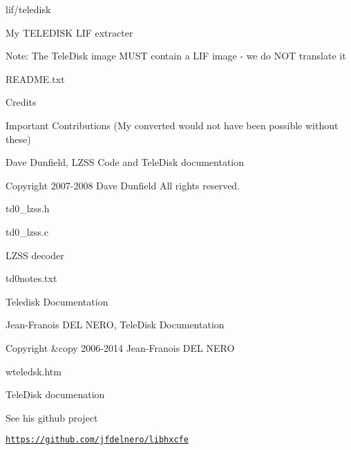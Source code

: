 lif/teledisk
\begin{DoxyItemize}
\item My T\+E\+L\+E\+D\+I\+SK L\+IF extracter
\begin{DoxyItemize}
\item Note\+: The Tele\+Disk image M\+U\+ST contain a L\+IF image -\/ we do N\+OT translate it
\end{DoxyItemize}
\item R\+E\+A\+D\+M\+E.\+txt
\begin{DoxyItemize}
\item Credits
\end{DoxyItemize}
\item Important Contributions (My converted would not have been possible without these)
\begin{DoxyItemize}
\item Dave Dunfield, L\+Z\+SS Code and Tele\+Disk documentation
\begin{DoxyItemize}
\item Copyright 2007-\/2008 Dave Dunfield All rights reserved.
\item td0\+\_\+lzss.\+h
\item td0\+\_\+lzss.\+c
\begin{DoxyItemize}
\item L\+Z\+SS decoder
\end{DoxyItemize}
\item td0notes.\+txt
\begin{DoxyItemize}
\item Teledisk Documentation
\end{DoxyItemize}
\end{DoxyItemize}
\item Jean-\/\+Franois D\+EL N\+E\+RO, Tele\+Disk Documentation
\begin{DoxyItemize}
\item Copyright \&copy 2006-\/2014 Jean-\/\+Franois D\+EL N\+E\+RO
\begin{DoxyItemize}
\item wteledsk.\+htm
\begin{DoxyItemize}
\item Tele\+Disk documenation
\end{DoxyItemize}
\item See his github project
\begin{DoxyItemize}
\item \href{https://github.com/jfdelnero/libhxcfe}{\tt https\+://github.\+com/jfdelnero/libhxcfe}
\end{DoxyItemize}
\end{DoxyItemize}
\end{DoxyItemize}
\end{DoxyItemize}
\end{DoxyItemize}


